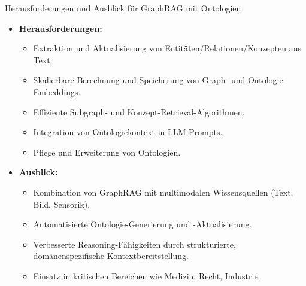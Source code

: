\documentclass[aspectratio=1610, xcolor=dvipsnames, 9pt]{beamer}
\begin{document}
\begin{frame}{Herausforderungen und Ausblick für GraphRAG mit Ontologien}
  \begin{itemize}
    \item \textbf{Herausforderungen:}
      \begin{itemize}
        \item Extraktion und Aktualisierung von Entitäten/Relationen/Konzepten aus Text.
        \item Skalierbare Berechnung und Speicherung von Graph- und Ontologie-Embeddings.
        \item Effiziente Subgraph- und Konzept-Retrieval-Algorithmen.
        \item Integration von Ontologiekontext in LLM-Prompts.
        \item Pflege und Erweiterung von Ontologien.
      \end{itemize}
    \item \textbf{Ausblick:}
      \begin{itemize}
        \item Kombination von GraphRAG mit multimodalen Wissensquellen (Text, Bild, Sensorik).
        \item Automatisierte Ontologie-Generierung und -Aktualisierung.
        \item Verbesserte Reasoning-Fähigkeiten durch strukturierte, domänenspezifische Kontextbereitstellung.
        \item Einsatz in kritischen Bereichen wie Medizin, Recht, Industrie.
      \end{itemize}
  \end{itemize}
\end{frame}
\end{document}
